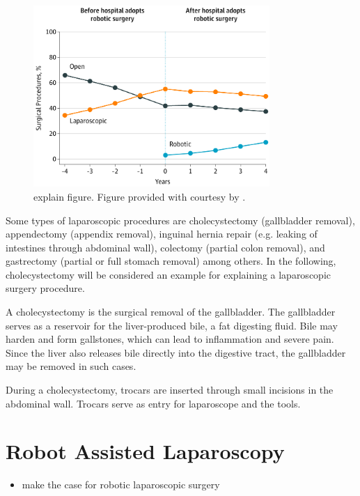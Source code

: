 \begin{figure}
    \centering
    \includegraphics[width=0.8\textwidth]{introduction/img/robotic_since_introduction.png}
    \caption{explain figure. Figure provided with courtesy by \cite{sheetz2020trends}.}
    \label{in:fig:robotic_vs_laparoscopic_vs_open}
\end{figure}
Some types of laparoscopic procedures are cholecystectomy (gallbladder removal), appendectomy (appendix removal), inguinal hernia repair (e.g. leaking of intestines through abdominal wall), colectomy (partial colon removal), and gastrectomy (partial or full stomach removal) among others. In the following, cholecystectomy will be considered an example for explaining a laparoscopic surgery procedure. 

A cholecystectomy is the surgical removal of the gallbladder. The gallbladder serves as a reservoir for the liver-produced bile, a fat digesting fluid. Bile may harden and form gallstones, which can lead to inflammation and severe pain. Since the liver also releases bile directly into the digestive tract, the gallbladder may be removed in such cases. 

During a cholecystectomy, trocars are inserted through small incisions in the abdominal wall. Trocars serve as entry for laparoscope and the tools. 


\section{Robot Assisted Laparoscopy}
\label{in:sec:robot_assisted_laparoscopy}

\begin{itemize}
    \item make the case for robotic laparoscopic surgery
\end{itemize}
